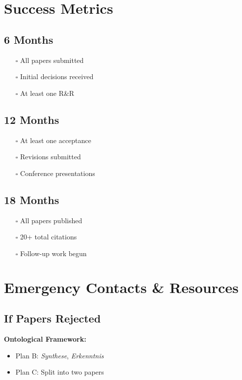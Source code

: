 \documentclass[12pt]{article}
\begin{document}
\section*{Success Metrics}

\subsection*{6 Months}
\begin{itemize}[itemsep=0pt]
\item[$\square$] All papers submitted
\item[$\square$] Initial decisions received
\item[$\square$] At least one R\&R
\end{itemize}

\subsection*{12 Months}
\begin{itemize}[itemsep=0pt]
\item[$\square$] At least one acceptance
\item[$\square$] Revisions submitted
\item[$\square$] Conference presentations
\end{itemize}

\subsection*{18 Months}
\begin{itemize}[itemsep=0pt]
\item[$\square$] All papers published
\item[$\square$] 20+ total citations
\item[$\square$] Follow-up work begun
\end{itemize}

\section*{Emergency Contacts \& Resources}

\subsection*{If Papers Rejected}

\textbf{Ontological Framework:}
\begin{itemize}[itemsep=0pt]
\item Plan B: \textit{Synthese}, \textit{Erkenntnis}
\item Plan C: Split into two papers
\end{itemize}
\end{document}
